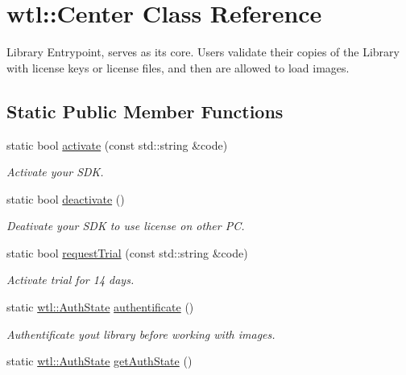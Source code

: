 \hypertarget{classwtl_1_1_center}{}\section{wtl\+:\+:Center Class Reference}
\label{classwtl_1_1_center}


Library Entrypoint, serves as its core. Users validate their copies of the Library with license keys or license files, and then are allowed to load images.  


\subsection*{Static Public Member Functions}
\begin{DoxyCompactItemize}
\item 
static bool \hyperlink{classwtl_1_1_center_a96188b25e9a7d0b2c3ef54bae69f6190}{activate} (const std\+::string \&code)
\begin{DoxyCompactList}\small\item\em Activate your S\+DK. \end{DoxyCompactList}\item 
static bool \hyperlink{classwtl_1_1_center_a61920c01a842e56b7605761414c865d0}{deactivate} ()
\begin{DoxyCompactList}\small\item\em Deativate your S\+DK to use license on other PC. \end{DoxyCompactList}\item 
static bool \hyperlink{classwtl_1_1_center_ab8831fd0255ae72ee48644cdb571e78d}{request\+Trial} (const std\+::string \&code)
\begin{DoxyCompactList}\small\item\em Activate trial for 14 days. \end{DoxyCompactList}\item 
static \hyperlink{namespacewtl_a74cc3b258b8e82a1d6e032fb4c937353}{wtl\+::\+Auth\+State} \hyperlink{classwtl_1_1_center_a1f1a7e622802706a8eef7ab781bc8efd}{authentificate} ()
\begin{DoxyCompactList}\small\item\em Authentificate yout library before working with images. \end{DoxyCompactList}\item 
static \hyperlink{namespacewtl_a74cc3b258b8e82a1d6e032fb4c937353}{wtl\+::\+Auth\+State} \hyperlink{classwtl_1_1_center_a54d31f4aafa2c68a86b7fd005aed26c4}{get\+Auth\+State} ()

\end{DoxyCompactItemize}

